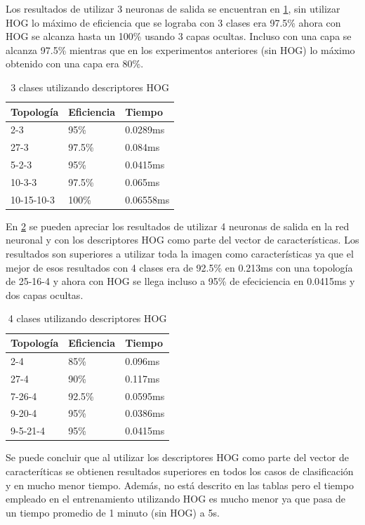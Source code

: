 Los resultados de utilizar 3 neuronas de salida se encuentran en \ref{Hog3Clases}, sin utilizar HOG lo máximo de eficiencia que se lograba con 3 clases era 97.5\% ahora con HOG se alcanza hasta un 100\% usando 3 capas ocultas. Incluso con una capa se alcanza 97.5\% mientras que en los experimentos anteriores (sin HOG) lo máximo obtenido con una capa era 80\%.

\begin{table}[]
	\centering
	\caption{3 clases utilizando descriptores HOG}
	\label{my-label}
	\begin{tabular}{|l|l|l|}
		\hline
		Topología  & Eficiencia & Tiempo    \\ \hline
		2-3        & 95\%       & 0.0289ms  \\ \hline
		27-3       & 97.5\%     & 0.084ms   \\ \hline
		5-2-3      & 95\%       & 0.0415ms  \\ \hline
		10-3-3     & 97.5\%     & 0.065ms   \\ \hline
		10-15-10-3 & 100\%      & 0.06558ms \\ \hline
	\end{tabular}\label{Hog3Clases}
\end{table}


En \ref{Hog4Clases} se pueden apreciar los resultados de utilizar 4 neuronas de salida en la red neuronal y con los descriptores HOG como parte del vector de características. Los resultados son superiores a utilizar toda la imagen como características ya que el mejor de esos resultados con 4 clases era de 92.5\% en 0.213ms con una topología de 25-16-4 y ahora con HOG se llega incluso a 95\% de efeciciencia en 0.0415ms y dos capas ocultas.
\begin{table}[]
	\centering
	\caption{4 clases utilizando descriptores HOG}
	\label{my-label}
	\begin{tabular}{|l|l|l|}
		\hline
		Topología & Eficiencia & Tiempo   \\ \hline
		2-4       & 85\%       & 0.096ms  \\ \hline
		27-4      & 90\%       & 0.117ms  \\ \hline
		7-26-4    & 92.5\%     & 0.0595ms \\ \hline
		9-20-4    & 95\%       & 0.0386ms \\ \hline
		9-5-21-4  & 95\%       & 0.0415ms \\ \hline
	\end{tabular}\label{Hog4Clases}
\end{table}

Se puede concluir que al utilizar los descriptores HOG como parte del vector de caracteríticas se obtienen resultados superiores en todos los casos de clasificación y en mucho menor tiempo. Además, no está descrito en las tablas pero el tiempo empleado en el entrenamiento utilizando HOG es mucho menor ya que pasa de un tiempo promedio de 1 minuto (sin HOG) a 5s.